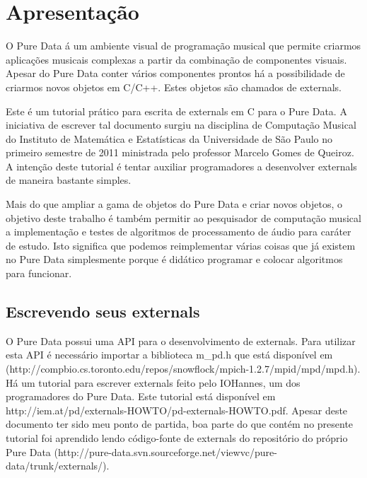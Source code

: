 \documentclass[10pt,a4paper]{report}
\begin{document}
\tableofcontents

 
\chapter{Apresentação}
O Pure Data á um ambiente visual de programação musical que permite criarmos aplicações musicais complexas a partir da combinação de componentes visuais. Apesar do Pure Data conter vários componentes prontos há a possibilidade de criarmos novos objetos em C/C++. Estes objetos são chamados de externals.

Este é um tutorial prático para escrita de externals em C para o Pure Data. A iniciativa de escrever tal documento surgiu na disciplina de Computação Musical do Instituto de Matemática e Estatísticas da Universidade de São Paulo no primeiro semestre de 2011 ministrada pelo professor Marcelo Gomes de Queiroz. A intenção deste tutorial é tentar auxiliar programadores a desenvolver externals de maneira bastante simples.

Mais do que ampliar a gama de objetos do Pure Data e criar novos objetos, o objetivo deste trabalho é também permitir ao pesquisador de computação musical a implementação e testes de algoritmos de processamento de áudio para caráter de estudo. Isto significa que podemos reimplementar várias coisas que já existem no Pure Data simplesmente porque é didático programar e colocar algoritmos para funcionar.

\section{Escrevendo seus externals}

O Pure Data possui uma API para o desenvolvimento de externals. Para utilizar esta API é necessário importar a biblioteca m\_pd.h que está disponível em (http://compbio.cs.toronto.edu/repos/snowflock/mpich-1.2.7/mpid/mpd/mpd.h). Há um tutorial para escrever externals feito pelo IOHannes, um dos programadores do Pure Data. Este tutorial está disponível em http://iem.at/pd/externals-HOWTO/pd-externals-HOWTO.pdf. Apesar deste documento ter sido meu ponto de partida, boa parte do que contém no presente tutorial foi aprendido lendo código-fonte de externals do repositório do próprio Pure Data (http://pure-data.svn.sourceforge.net/viewvc/pure-data/trunk/externals/).
\end{document}
